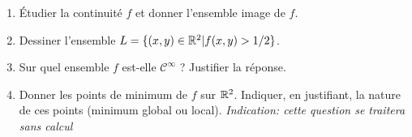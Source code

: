 \documentclass[a4paper]{tp_um}
\begin{document}
\begin{enumerate}
	\item Étudier la continuité $f$ et donner l'ensemble image de $f$. 


	\item Dessiner l'ensemble $L = \{(x,y) \in \mathbb{R}^2 | f(x,y)> 1/2\}$.



	\item Sur quel ensemble $f$ est-elle $\mathcal C^\infty$ ? Justifier la réponse.
	

	\item Donner les points de minimum de $f$ sur $\mathbb{R}^2$. Indiquer, en justifiant, la nature de ces points (minimum global ou local).
		\textit{Indication: cette question se traitera sans calcul}
	

\end{enumerate}
\end{document}
